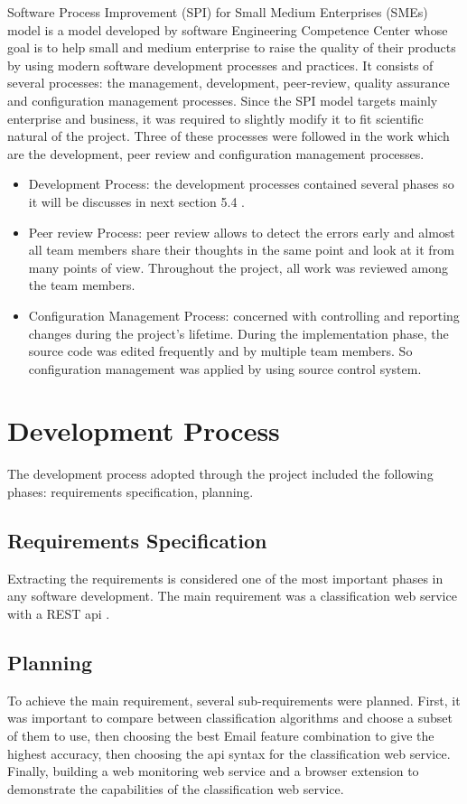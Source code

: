 Software Process Improvement (SPI) for Small Medium Enterprises (SMEs)
model is a model developed by software Engineering Competence Center
whose goal is to help small and medium enterprise to raise the quality of
their products by using modern software development processes and practices. 
It consists of several processes: the management, development, peer-review, 
quality assurance and configuration management processes. Since
the SPI model targets mainly enterprise and business, it was required to
slightly modify it to fit scientific natural of the project. Three of these 
processes were followed in the work which are the development, peer review and
configuration management processes.

\begin{itemize}
  \item Development Process: the development processes contained several
  phases so it will be discusses in next section 5.4 .
  \item Peer review Process: peer review allows to detect the errors early and
  almost all team members share their thoughts in the same point and
  look at it from many points of view. Throughout the project, all work
  was reviewed among the team members.
  \item Configuration Management Process: concerned with controlling and
  reporting changes during the project's lifetime. During the implementation 
  phase, the source code was edited frequently and by multiple
  team members. So configuration management was applied by using
  source control system.
\end{itemize}

\section{Development Process}

The development process adopted through the project included the following
phases: requirements specification, planning.

\subsection{Requirements Specification}
Extracting the requirements is considered one of the most important phases
in any software development. The main requirement was a classification web 
service with a REST api \cite{REST}.
\subsection{Planning}
To achieve the main requirement, several sub-requirements were planned.
First, it was important to compare between classification algorithms and choose 
a subset of them to use, then choosing the best Email feature combination to 
give the highest accuracy, then choosing the api syntax for the classification 
web service. Finally, building a web monitoring web service and a browser extension 
to demonstrate the capabilities of the classification web service.
